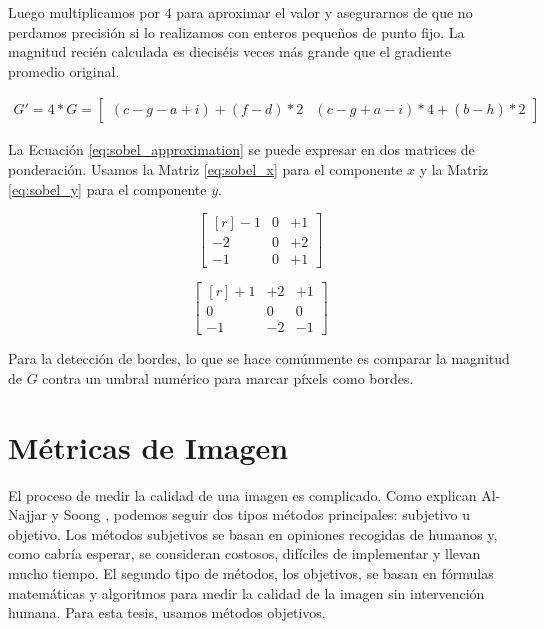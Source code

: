 \documentclass{cslthse-msc}
\begin{document}
Luego multiplicamos por $4$ para aproximar el valor y asegurarnos de que no perdamos precisión si lo realizamos con enteros pequeños de punto fijo. La magnitud recién calculada es dieciséis veces más grande que el gradiente promedio original.

\begin{equation}\label{eq:sobel_approximation}
\begin{split}
G' = 4 * G =\begin{bmatrix*}(c-g-a+i)+(f-d)*2 & (c-g+a-i)*4+(b-h)*2\end{bmatrix*}
\end{split}
\end{equation}

La Ecuación \ref{eq:sobel_approximation} se puede expresar en dos matrices de ponderación. Usamos la Matriz \ref{eq:sobel_x} para el componente $x$ y la Matriz \ref{eq:sobel_y} para el componente $y$.

\begin{equation}
\begin{bmatrix*}[r]\label{eq:sobel_x}
-1 &  0 & +1 \\
-2 &  0 & +2 \\
-1 &  0 & +1
\end{bmatrix*}
\end{equation}

\begin{equation}
\begin{bmatrix*}[r]\label{eq:sobel_y}
+1 & +2 & +1 \\
 0 &  0 &  0 \\
-1 & -2 & -1
\end{bmatrix*}
\end{equation}

Para la detección de bordes, lo que se hace comúnmente es comparar la magnitud de $G$ contra un umbral numérico para marcar píxels como bordes.

\section{Métricas de Imagen}
El proceso de medir la calidad de una imagen es complicado. Como explican Al-Najjar y Soong \cite{Yusra2012}, podemos seguir dos tipos métodos principales: subjetivo u objetivo. Los métodos subjetivos se basan en opiniones recogidas de humanos y, como cabría esperar, se consideran costosos, difíciles de implementar y llevan mucho tiempo. El segundo tipo de métodos, los objetivos, se basan en fórmulas matemáticas y algoritmos para medir la calidad de la imagen sin intervención humana. Para esta tesis, usamos métodos objetivos.
\end{document}
